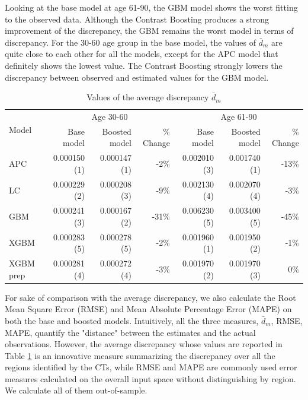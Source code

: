 \documentclass[fleqn,10pt]{wlscirep}
\begin{document}
Looking at the base model at age 61-90, the GBM model shows the worst fitting to the observed data. Although the Contrast Boosting produces a strong improvement of the discrepancy, the GBM remains the worst model in terms of discrepancy.
For the 30-60 age group in the base model, the values of $\bar{d}_m$ are quite close to each other for all the models, except for the APC model that definitely shows the lowest value.
The Contrast Boosting strongly lowers the discrepancy between observed and estimated values for the GBM model.
%
\begin{table}[ht]
\centering
\footnotesize
\begin{tabular}{|l|r|r|r|r|r|r|}
\hline
\multirow{2}{*}{Model} & \multicolumn{3}{c|}{Age 30-60} & \multicolumn{3}{c|}{Age 61-90} \\
\cline{2-7}
			&	Base model	&	Boosted model	& \% Change &	Base model	&	Boosted model	& \% Change\\
\hline
APC 			&	0.000150	(1)	&	0.000147 (1)	&	-2\%	&	0.002010 (3)	&	0.001740 (1)	&	-13\%\\
LC 			&	0.000229	(2)	&	0.000208 (3) 	&	-9\%	&	0.002130 (4)	&	0.002070 (4)	&	-3\%	\\
GBM 		&	0.000241	(3)	&	0.000167 (2)	&	-31\%&	0.006230 (5)	&	0.003400 (5)	&	-45\%\\
XGBM 		&	0.000283	(5)	&	0.000278 (5)	&	-2\%	&	0.001960 (1)	&	0.001950 (2)	&	-1\%	\\
XGBM prep 	&	0.000281	(4)	&	0.000272 (4)	&	-3\%	&	0.001970 (2) 	&	0.001970 (3)	&	0\%	\\
\hline
\end{tabular}
\caption{Values of the average discrepancy $\bar{d}_m$}
\label{tab:avecri}
\end{table}
%
For sake of comparison with the average discrepancy, we also calculate the Root Mean Square Error (RMSE) and Mean Absolute Percentage Error (MAPE) on both the base and boosted models. 
Intuitively, all the three measures, $\bar{d}_m$, RMSE, MAPE, quantify the "distance" between the estimates and the actual observations. 
However, the average discrepancy whose values are reported in Table \ref{tab:avecri} is an innovative measure summarizing the discrepancy over all the regions identified by the CTs, while RMSE and MAPE are commonly used error measures calculated on the overall input space without distinguishing by region. We calculate all of them out-of-sample.
\end{document}
